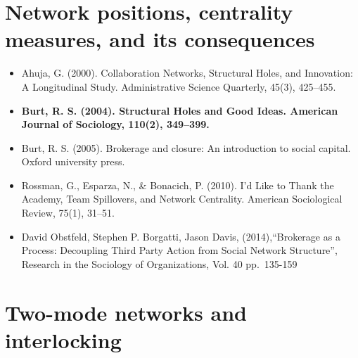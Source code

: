\documentclass[
]{book}
\begin{document}
\section*{\texorpdfstring{\textbf{Network positions, centrality measures, and its consequences}}{Network positions, centrality measures, and its consequences}}\label{network-positions-centrality-measures-and-its-consequences}

\begin{itemize}
\item
  Ahuja, G. (2000). Collaboration Networks, Structural Holes, and Innovation: A Longitudinal Study. Administrative Science Quarterly, 45(3), 425--455.
\item
  \textbf{Burt, R. S. (2004). Structural Holes and Good Ideas. American Journal of Sociology, 110(2), 349--399.}
\item
  Burt, R. S. (2005). Brokerage and closure: An introduction to social capital. Oxford university press.
\item
  Rossman, G., Esparza, N., \& Bonacich, P. (2010). I'd Like to Thank the Academy, Team Spillovers, and Network Centrality. American Sociological Review, 75(1), 31--51.
\item
  David Obstfeld, Stephen P. Borgatti, Jason Davis, (2014),``Brokerage as a Process: Decoupling Third Party Action from Social Network Structure'', Research in the Sociology of Organizations, Vol. 40 pp.~135-159
\end{itemize}

\section*{\texorpdfstring{\textbf{Two-mode networks and interlocking}}{Two-mode networks and interlocking}}\label{two-mode-networks-and-interlocking}
\end{document}
